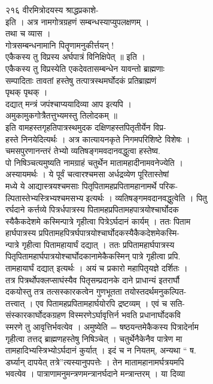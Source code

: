 \documentclass[11pt, openany]{book}
\begin{document}
{{{{{{{{{{{{{{{{२१६ वीरमित्रोदयस्य श्राद्धप्रकाशे-}{\\
इति । अत्र नामगोत्रग्रहणं सम्बन्धस्याप्युपलक्षणम् ।\\
तथा च व्यास ।\\
गोत्रसम्बन्धनामानि पितॄणामनुकीर्त्तयन् !\\
एकैकस्य तु विप्रस्य अर्घपात्रं विनिक्षिपेत् ॥ इति ।\\
एकैकस्य तु विप्रस्येति एकदेवतासम्बन्धेन यावन्तो ब्राह्मणाः\\
सम्पादिताः तावतां हस्तेषु तत्पात्रस्थमर्घोदकं प्रतिब्राह्मणं\\
पृथक् पृथक् ।\\
दद्यात् मन्त्रं जपंश्चाप्ययादिव्या आप इत्यपि ।\\
अमुकामुकगोत्रैतत्तुभ्यमस्तु तिलोदकम् }{॥}{\\
इति वामहस्तगृहतिपात्रस्थमुदक दक्षिणहस्तपितृतीर्येन विप्र-\\
हस्ते निनयेदित्यर्थः । अत्र कात्यायनकृते निगमपरिशिष्टे विशेषः ।\\
चमसपुरणानन्तरं तेभ्यो व्यतिषङ्गमवदानवद्धुत्वा हस्तेष्व.\\
पो निषिञ्चत्यमुष्यति नामग्राहं चतुर्थेन मातामहादीनामवनेज्येति ।\\
अस्यायमर्थः । ये पूर्वं चत्वारश्चमसा अर्धद्रव्येण पूरितास्तेषां\\
मध्ये ये आद्यास्त्रयश्चमसाः पितृपितामहप्रपितामहानामर्थे परिक-\\
ल्पितास्तेभ्यस्त्रिभ्यश्चमसभ्य इत्यर्थः । व्यतिषङ्गमवदानवद्धुत्वेति ।
पितु\\
रर्घदाने कर्त्तव्ये पित्रर्धपात्रस्य पितामहप्रपितामहपात्रयोश्चार्घोदक\\
स्यैकैकदेशमे कस्मिन्पात्रे गृहीत्वा पित्रेऽर्घदानं कार्यम् । ततः पिताम\\
हार्घपात्रस्य प्रपितामहपित्रर्घपात्रयोश्चार्घोदकस्यैकैकदेशमेकस्मि-\\
न्पात्रे गृहीत्वा पितामहायार्घं दद्यात् । ततः प्रपितामहार्घपात्रस्य\\
पितृपितामहार्घपात्रयोश्चार्घोदकानामेकैकस्मिन् पात्रे गृहीत्वा प्रपि.\\
तामहायार्घं दद्यात् इत्यर्थः । अयं च प्रकारो महापितृयज्ञे दर्शितः ।\\
तत्र पित्रर्थोपक्लप्साघंस्यैव पितृसम्प्रदानके दाने प्राधान्यं इतरार्घौ\\
दकयोस्तु तत्र तत्सस्कारकत्वेन गुणभूतता तयोस्तदर्थमनुकल्पित-\\
तत्त्वात् । एव पितामहप्रपितामहार्घयोरपि द्रष्टव्यम् । एवं च सति-\\
संस्कारकार्घोदकग्रहण विस्मरणेऽर्घावृत्तिर्न भवति प्रधानार्घोदकवि\\
स्मरणे तु आवृत्तिर्भवत्येव । अमुष्येति = षष्ठयन्तमेकैकस्य
पित्रादेर्नाम\\
गृहीत्वा तत्तद् ब्राह्मणहस्तेषु निषिञ्चेत् । चतुर्थेनैकेनैव पात्रेण मा\\
तामहादिभ्यस्त्रिभ्योऽर्घदानं कुर्यात् । इदं च न नियतम्, अन्यथा `` ष.\\
डर्घ्यान् दापयेत् तत्रे''त्यस्यानुपपत्तेः । तेन मातामहानामर्घत्रयमपि\\
भवत्येव । पात्राणामनुमन्त्रणमन्त्रानर्घदाने मन्त्रान्तरम् । या
दिव्या\\


}}}}}}}}}}}}}}}}
\end{document}
